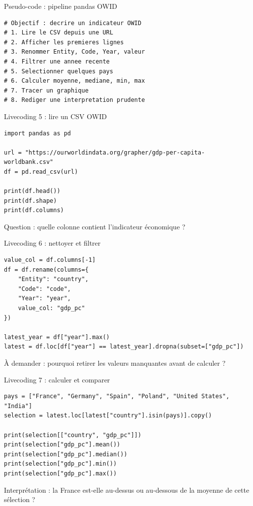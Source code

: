 \documentclass[10pt,aspectratio=169]{beamer}
\begin{document}
\begin{frame}[fragile]{Pseudo-code : pipeline pandas OWID}
\begin{lstlisting}
# Objectif : decrire un indicateur OWID
# 1. Lire le CSV depuis une URL
# 2. Afficher les premieres lignes
# 3. Renommer Entity, Code, Year, valeur
# 4. Filtrer une annee recente
# 5. Selectionner quelques pays
# 6. Calculer moyenne, mediane, min, max
# 7. Tracer un graphique
# 8. Rediger une interpretation prudente
\end{lstlisting}
\end{frame}

\begin{frame}[fragile]{Livecoding 5 : lire un CSV OWID}
\begin{lstlisting}
import pandas as pd

url = "https://ourworldindata.org/grapher/gdp-per-capita-worldbank.csv"
df = pd.read_csv(url)

print(df.head())
print(df.shape)
print(df.columns)
\end{lstlisting}
Question : quelle colonne contient l'indicateur économique ?
\end{frame}

\begin{frame}[fragile]{Livecoding 6 : nettoyer et filtrer}
\begin{lstlisting}
value_col = df.columns[-1]
df = df.rename(columns={
    "Entity": "country",
    "Code": "code",
    "Year": "year",
    value_col: "gdp_pc"
})

latest_year = df["year"].max()
latest = df.loc[df["year"] == latest_year].dropna(subset=["gdp_pc"])
\end{lstlisting}
À demander : pourquoi retirer les valeurs manquantes avant de calculer ?
\end{frame}

\begin{frame}[fragile]{Livecoding 7 : calculer et comparer}
\begin{lstlisting}
pays = ["France", "Germany", "Spain", "Poland", "United States", "India"]
selection = latest.loc[latest["country"].isin(pays)].copy()

print(selection[["country", "gdp_pc"]])
print(selection["gdp_pc"].mean())
print(selection["gdp_pc"].median())
print(selection["gdp_pc"].min())
print(selection["gdp_pc"].max())
\end{lstlisting}
Interprétation : la France est-elle au-dessus ou au-dessous de la moyenne de cette sélection ?
\end{frame}
\end{document}
